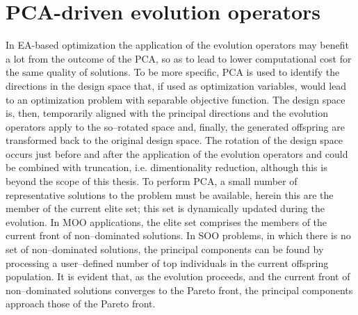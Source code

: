 \section{PCA-driven evolution operators} 
In EA-based optimization the application of the evolution operators may benefit a lot from the outcome of the PCA, so as to lead to lower computational cost for the same quality of solutions. To be more specific, PCA is used to identify the directions in the design space that, if used as optimization variables, would lead to an optimization problem with separable objective function. The design space is, then, temporarily aligned with the principal directions and the evolution operators apply to the so--rotated space and, finally, the generated offspring are transformed back to the original design space. The rotation of the design space occurs just before and after the application of the evolution operators and could be combined with truncation, i.e. dimentionality reduction, although this is beyond the scope of this thesis. To perform PCA, a small number of representative solutions to the problem must be available, herein this are the member of the current elite set; this set is dynamically updated during the evolution. In MOO applications, the elite set comprises the members of the current front of non--dominated solutions. In SOO problems, in which there is no set of non--dominated solutions, the principal components can be found by processing a user--defined number of top individuals in the current offspring population. It is evident that, as the evolution proceeds, and the current front of non--dominated solutions converges to the Pareto front, the principal components approach those of the Pareto front. 

